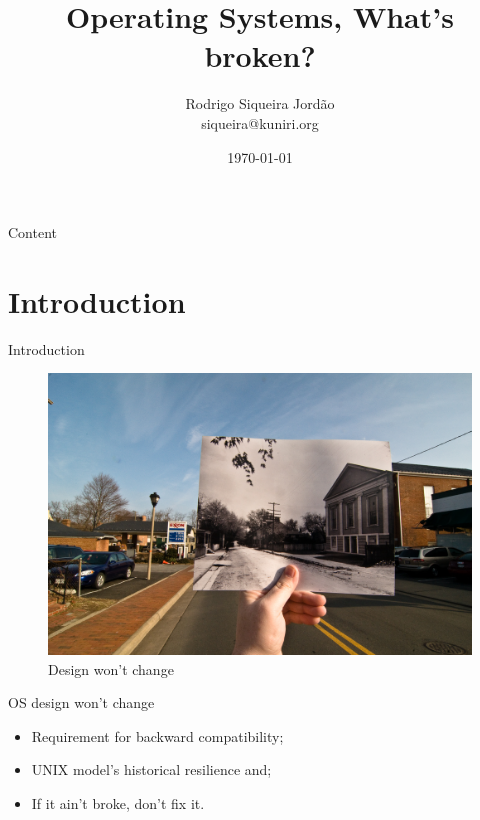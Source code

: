 \documentclass[10pt]{beamer}
\title[] %
{ %
      \textbf{Operating Systems, What's broken?}
}
\subtitle[Operating Systems, What's broken?]
{
}
\author[Rodrigo Siqueira Jordão]
{      Rodrigo Siqueira Jordão \\
      {\ttfamily siqueira@kuniri.org}
}
\institute[]
{
      Institute of Mathematics and Statistics\\
      University of Sao Paulo\\
  
}
\date{\today}
\begin{document}

{\1%
\begin{frame} 
  \titlepage %
\end{frame}}

\begin{frame}{Content}{}
  \tableofcontents
\end{frame}

\section{Introduction}
\begin{frame}{Introduction}
  \begin{figure}[ht]
    \vspace{5pt}
    \centering
    \includegraphics[width=1\textwidth, keepaspectratio=true]{images/designwontchange.jpg}
    \caption {Design won't change}
    \label {assembler}
  \end{figure}
\end{frame}

\begin{frame}{OS design won't change}
  \begin{itemize}
    \item Requirement for backward compatibility; \pause
    \item UNIX model's historical resilience and; \pause
    \item If it ain't broke, don't fix it.
  \end{itemize}
\end{frame}
\end{document}

